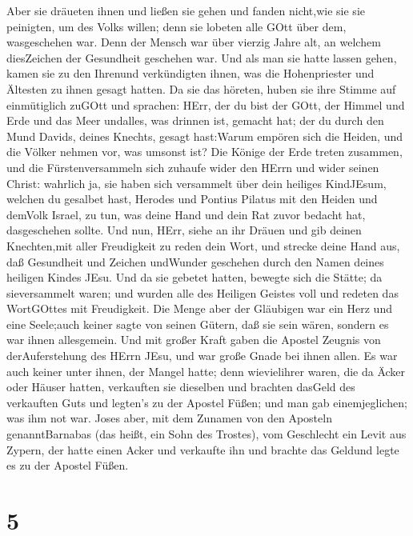 Aber sie dräueten ihnen und ließen sie gehen und fanden nicht,wie sie
sie peinigten, um des Volks willen; denn sie lobeten alle GOtt über dem,
wasgeschehen war.  Denn der Mensch war über vierzig Jahre
alt, an welchem diesZeichen der Gesundheit geschehen war. 
Und als man sie hatte lassen gehen, kamen sie zu den Ihrenund
verkündigten ihnen, was die Hohenpriester und Ältesten zu ihnen gesagt
hatten.  Da sie das höreten, huben sie ihre Stimme auf
einmütiglich zuGOtt und sprachen: HErr, der du bist der GOtt, der Himmel
und Erde und das Meer undalles, was drinnen ist, gemacht hat;
 der du durch den Mund Davids, deines Knechts, gesagt
hast:Warum empören sich die Heiden, und die Völker nehmen vor, was
umsonst ist?  Die Könige der Erde treten zusammen, und die
Fürstenversammeln sich zuhaufe wider den HErrn und wider seinen Christ:
 wahrlich ja, sie haben sich versammelt über dein heiliges
KindJEsum, welchen du gesalbet hast, Herodes und Pontius Pilatus mit den
Heiden und demVolk Israel,  zu tun, was deine Hand und dein
Rat zuvor bedacht hat, dasgeschehen sollte.  Und nun, HErr,
siehe an ihr Dräuen und gib deinen Knechten,mit aller Freudigkeit zu
reden dein Wort,  und strecke deine Hand aus, daß
Gesundheit und Zeichen undWunder geschehen durch den Namen deines
heiligen Kindes JEsu.  Und da sie gebetet hatten, bewegte
sich die Stätte; da sieversammelt waren; und wurden alle des Heiligen
Geistes voll und redeten das WortGOttes mit Freudigkeit. 
Die Menge aber der Gläubigen war ein Herz und eine Seele;auch keiner
sagte von seinen Gütern, daß sie sein wären, sondern es war ihnen
allesgemein.  Und mit großer Kraft gaben die Apostel
Zeugnis von derAuferstehung des HErrn JEsu, und war große Gnade bei
ihnen allen.  Es war auch keiner unter ihnen, der Mangel
hatte; denn wievielihrer waren, die da Äcker oder Häuser hatten,
verkauften sie dieselben und brachten dasGeld des verkauften Guts
 und legten's zu der Apostel Füßen; und man gab
einemjeglichen; was ihm not war.  Joses aber, mit dem
Zunamen von den Aposteln genanntBarnabas (das heißt, ein Sohn des
Trostes), vom Geschlecht ein Levit aus Zypern,  der hatte
einen Acker und verkaufte ihn und brachte das Geldund legte es zu der
Apostel Füßen.

\hypertarget{section-4}{%
\section{5}\label{section-4}}

